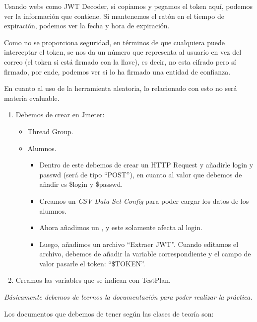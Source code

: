 Usando webs como JWT Decoder, si copiamos y pegamos el token aquí, podemos ver la información que contiene. Si mantenemos el ratón en el tiempo de expiración, podemos ver la fecha y hora de expiración. 

Como no se proporciona seguridad, en términos de que cualquiera puede interceptar el token, se nos da un número que representa al usuario en vez del correo (el token si está firmado con la llave), es decir, no esta cifrado pero sí firmado, por ende, podemos ver si lo ha firmado una entidad de confianza.

En cuanto al uso de la herramienta aleatoria, lo relacionado con esto no será materia evaluable. 

\begin{enumerate}
  \item Debemos de crear en Jmeter:
  \begin{itemize}
    \item Thread Group.
    \item Alumnos.
    \begin{itemize}
      \item Dentro de este debemos de crear un HTTP Request y añadirle login y passwd (será de tipo ``POST''), en cuanto al valor que debemos de añadir es \${login} y \${passwd}.
      \item Creamos un \textit{CSV Data Set Config} para poder cargar los datos de los alumnos.
      \item Ahora añadimos un , y este solamente afecta al login.
      \item Luego, añadimos un archivo ``Extraer JWT''. Cuando editamos el archivo, debemos de añadir la variable correspondiente y el campo de valor pasarle el token: ``\${TOKEN}''.
    \end{itemize}
  \end{itemize}
  \item Creamos las variables que se indican con TestPlan.
\end{enumerate}
\textit{Básicamente debemos de leernos la documentación para poder realizar la práctica.}

Los documentos que debemos de tener según las clases de teoría son:

